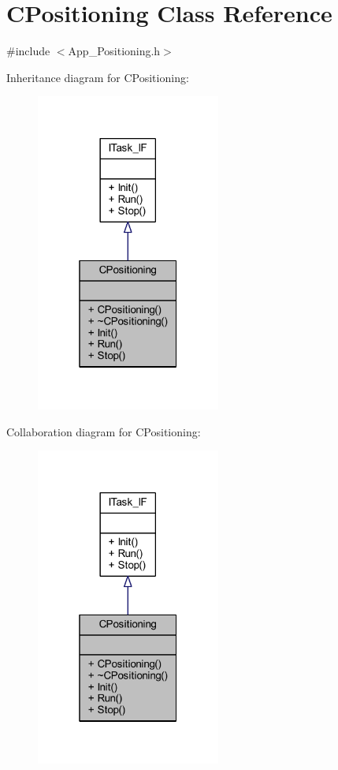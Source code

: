 \hypertarget{class_c_positioning}{}\section{C\+Positioning Class Reference}
\label{class_c_positioning}


{\ttfamily \#include $<$App\+\_\+\+Positioning.\+h$>$}



Inheritance diagram for C\+Positioning\+:\nopagebreak
\begin{figure}[H]
\begin{center}
\leavevmode
\includegraphics[width=172pt]{class_c_positioning__inherit__graph}
\end{center}
\end{figure}


Collaboration diagram for C\+Positioning\+:\nopagebreak
\begin{figure}[H]
\begin{center}
\leavevmode
\includegraphics[width=172pt]{class_c_positioning__coll__graph}
\end{center}
\end{figure}
